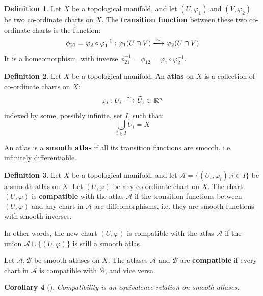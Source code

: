\documentclass[12pt]{article}
\theoremstyle{definition}
\newtheorem{definition}{Definition}[section]
\theoremstyle{plain}
\newtheorem{corollary}[definition]{Corollary}
\theoremstyle{remark}
\newcommand{\R}{\mathbb{R}}
\begin{document}
\begin{definition}\label{def:transition-function}
  Let \( X \) be a topological manifold, and let \( (U, \varphi_1) \) and \( (V, \varphi_2) \) be two co-ordinate charts on \( X \).
  The \textbf{transition function} between these two co-ordinate charts is the function:
  \[
    \phi_{21} = \varphi_2 \circ \varphi_1^{-1} : \varphi_1(U \cap V) \xlongrightarrow{\sim} \varphi_2(U \cap V)
  \]
  It is a homeomorphism, with inverse \( \phi_{21}^{-1} = \phi_{12} = \varphi_1 \circ \varphi_2^{-1} \).
\end{definition}

\begin{definition}\label{def:atlas}
  Let \( X \) be a topological manifold.
  An \textbf{atlas} on \( X \) is a collection of co-ordinate charts on \( X \):
  \[
    \varphi_i : U_i \xlongrightarrow{\sim} \widetilde{U}_i \subset \R^n
  \]
  indexed by some, possibly infinite, set \( I \), such that:
  \[
  \bigcup_{i \in I}U_i = X
  \]

  An atlas is a \textbf{smooth atlas} if all its transition functions are smooth, i.e. infinitely differentiable.
\end{definition}

\begin{definition}\label{def:compatible-atlases}
  Let \( X \) be a topological manifold, and let \( \mathcal{A} = \{(U_i, \varphi_i); i \in I\} \) be a smooth atlas on \( X \).
  Let \( (U, \varphi) \) be any co-ordinate chart on \( X \).
  The chart \( (U, \varphi) \) is \textbf{compatible} with the atlas \( \mathcal{A} \) if the transition functions between \( (U, \varphi) \) and any chart in \( \mathcal{A} \) are diffeomorphisms, i.e. they are smooth functions with smooth inverses.

  In other words, the new chart \( (U, \varphi) \) is compatible with the atlas \( \mathcal{A} \) if the union \( \mathcal{A} \cup \{(U, \varphi)\} \) is still a smooth atlas.

  \bigskip
  \noindent

  Let \( \mathcal{A}, \mathcal{B} \) be smooth atlases on \( X \). The atlases \( \mathcal{A} \) and \( \mathcal{B} \) are \textbf{compatible} if every chart in \( \mathcal{A} \) is compatible with \( \mathcal{B} \), and vice versa.
\end{definition}

\begin{corollary}[{\cite[Corollary 2.20]{segal}}]\label{cor:compatibility-equivalence}
  Compatibility is an equivalence relation on smooth atlases.
\end{corollary}
\end{document}
